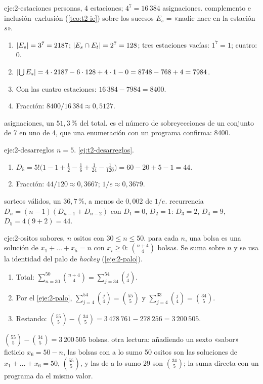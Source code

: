 \begin{solucion}{eje:2-estaciones}
 personas, 4 estaciones; $4^{7}=16\,384$ asignaciones.
\planteamiento complemento e inclusión--exclusión (\cref{teo:t2-ie}) sobre los sucesos $E_s$ = «nadie nace en la estación $s$».
\pasos
\begin{enumerate}[label=\arabic*.]
  \item $\lvert E_s\rvert=3^{7}=2187$; $\lvert E_s\cap E_t\rvert=2^{7}=128$; tres estaciones vacías: $1^{7}=1$; cuatro: 0.
  \item $\lvert\bigcup E_s\rvert=4\cdot2187-6\cdot128+4\cdot1-0=8748-768+4=7984$.
  \item Con las cuatro estaciones: $16\,384-7984=8400$.
  \item Fracción: $8400/16\,384\approx0{,}5127$.
\end{enumerate}
 asignaciones, un $51{,}3\,\%$ del total.
\comprobacion es el número de sobreyecciones de un conjunto de 7 en uno de 4, que una enumeración con un programa confirma: 8400.
\end{solucion}

\begin{solucion}{eje:2-desarreglos}
\datos $n=5$.
\planteamiento \cref{ej:t2-desarreglos}.
\pasos
\begin{enumerate}[label=\arabic*.]
  \item $D_5=5!\bigl(1-1+\tfrac12-\tfrac16+\tfrac1{24}-\tfrac1{120}\bigr)=60-20+5-1=44$.
  \item Fracción: $44/120\approx0{,}3667$; $1/e\approx0{,}3679$.
\end{enumerate}
 sorteos válidos, un $36{,}7\,\%$, a menos de $0{,}002$ de $1/e$.
\comprobacion recurrencia $D_n=(n-1)(D_{n-1}+D_{n-2})$ con $D_1=0$, $D_2=1$: $D_3=2$, $D_4=9$, $D_5=4(9+2)=44$.
\end{solucion}

\begin{solucion}{eje:2-ositos}
 sabores, $n$ ositos con $30\le n\le50$.
\planteamiento para cada $n$, una bolsa es una solución de $x_1+\dots+x_5=n$ con $x_i\ge0$: $\binom{n+4}{4}$ bolsas. Se suma sobre $n$ y se usa la identidad del palo de \emph{hockey} (\cref{eje:2-palo}).
\pasos
\begin{enumerate}[label=\arabic*.]
  \item Total: $\sum_{n=30}^{50}\binom{n+4}{4}=\sum_{j=34}^{54}\binom j4$.
  \item Por el \cref{eje:2-palo}, $\sum_{j=4}^{54}\binom j4=\binom{55}5$ y $\sum_{j=4}^{33}\binom j4=\binom{34}5$.
  \item Restando: $\binom{55}{5}-\binom{34}{5}=3\,478\,761-278\,256=3\,200\,505$.
\end{enumerate}
\resultado $\binom{55}5-\binom{34}5=3\,200\,505$ bolsas.
\comprobacion otra lectura: añadiendo un sexto «sabor» ficticio $x_6=50-n$, las bolsas con a lo sumo 50 ositos son las soluciones de $x_1+\dots+x_6=50$, $\binom{55}{5}$, y las de a lo sumo 29 son $\binom{34}{5}$; la suma directa con un programa da el mismo valor.
\end{solucion}

